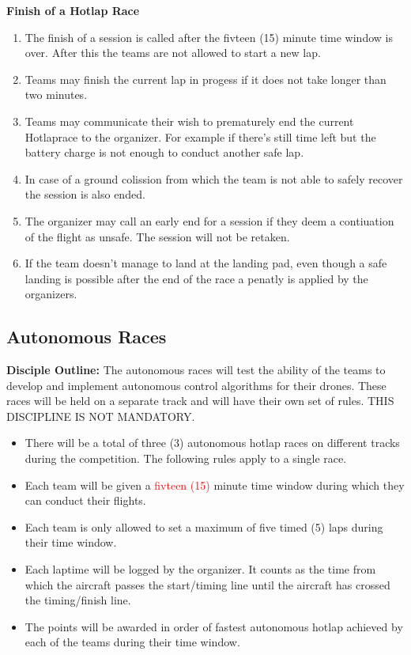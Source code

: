     \textbf{Finish of a Hotlap Race}
    \begin{enumerate}[resume]
      \item The finish of a session is called after the fivteen (15) minute time window is over. After this the teams are not allowed to start a new lap.
      \item Teams may finish the current lap in progess if it does not take longer than two minutes.
      \item Teams may communicate their wish to prematurely end the current Hotlaprace to the organizer. For example if there's still time left but the battery charge is not enough to conduct another safe lap.
      \item In case of a ground colission from which the team is not able to safely recover the session is also ended. 
      \item The organizer may call an early end for a session if they deem a contiuation of the flight as unsafe. The session will not be retaken.  
      \item If the team doesn't manage to land at the landing pad, even though a safe landing is possible after the end of the race a penatly is applied by the organizers.
    \end{enumerate}

 

    \subsection{Autonomous Races}
    \textbf{Disciple Outline: }The autonomous races will test the ability of the teams to develop and implement autonomous control algorithms for their drones. These races will be held on a separate track and will have their own set of rules. THIS DISCIPLINE IS NOT MANDATORY.
 
    
    \begin{itemize}
      \item There will be a total of three (3) autonomous hotlap races on different tracks during the competition. The following rules apply to a single race.
      \item Each team will be given a \textcolor{red}{fivteen (15) } minute time window during which they can conduct their flights. 
      \item Each team is only allowed to set a maximum of five timed (5) laps during their time window. 
      \item Each laptime will be logged by the organizer. It counts as the time from which the aircraft passes the start/timing line until the aircraft has crossed the timing/finish line. 
      \item The points will be awarded in order of fastest autonomous hotlap achieved by each of the teams during their time window.
    \end{itemize}


